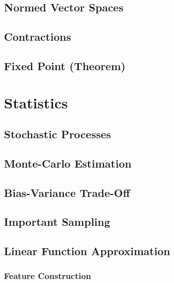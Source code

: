 		\subsection{Normed Vector Spaces} %

		\subsection{Contractions} %

		\subsection{Fixed Point (Theorem)} %

	\section{Statistics} %

		\subsection{Stochastic Processes} %

		\subsection{Monte-Carlo Estimation} %

		\subsection{Bias-Variance Trade-Off} %

		\subsection{Important Sampling} %

		\subsection{Linear Function Approximation} %

			\subsubsection{Feature Construction} %

